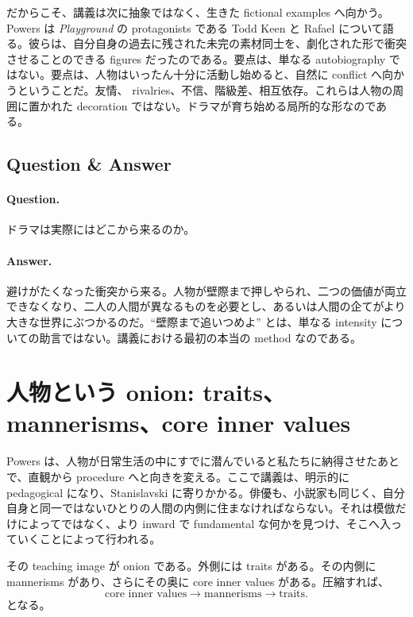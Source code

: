 だからこそ、講義は次に抽象ではなく、生きた fictional examples へ向かう。Powers は \emph{Playground} の protagonists である Todd Keen と Rafael について語る。彼らは、自分自身の過去に残された未完の素材同士を、劇化された形で衝突させることのできる figures だったのである。要点は、単なる autobiography ではない。要点は、人物はいったん十分に活動し始めると、自然に conflict へ向かうということだ。友情、 rivalries、不信、階級差、相互依存。これらは人物の周囲に置かれた decoration ではない。ドラマが育ち始める局所的な形なのである。

\subsection{Question \& Answer}

\paragraph{Question.} ドラマは実際にはどこから来るのか。

\paragraph{Answer.} 避けがたくなった衝突から来る。人物が壁際まで押しやられ、二つの価値が両立できなくなり、二人の人間が異なるものを必要とし、あるいは人間の企てがより大きな世界にぶつかるのだ。``壁際まで追いつめよ'' とは、単なる intensity についての助言ではない。講義における最初の本当の method なのである。

\section{人物という onion: traits、mannerisms、core inner values}

Powers は、人物が日常生活の中にすでに潜んでいると私たちに納得させたあとで、直観から procedure へと向きを変える。ここで講義は、明示的に pedagogical になり、Stanislavski に寄りかかる。俳優も、小説家も同じく、自分自身と同一ではないひとりの人間の内側に住まなければならない。それは模倣だけによってではなく、より inward で fundamental な何かを見つけ、そこへ入っていくことによって行われる。

その teaching image が onion である。外側には traits がある。その内側に mannerisms があり、さらにその奥に core inner values がある。圧縮すれば、
\begin{equation}
\text{core inner values} \to \text{mannerisms} \to \text{traits}.
\end{equation}
となる。

